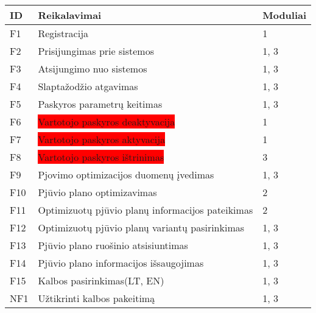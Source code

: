 \documentclass[a4paper,12pt]{article}
\begin{document}
\begin{frame}
\centering
\hspace{-2.5cm}
\label{my-label}
\begin{tabular}{|l|l|l|}
\hline
\textbf{ID}	& \textbf{Reikalavimai}						& \textbf{Moduliai}  \\ \hline

F1	& Registracija										& 1	     		\\ \hline

F2	& Prisijungimas prie sistemos						& 1, 3			\\ \hline

F3	& Atsijungimo nuo sistemos							& 1, 3			\\ \hline

F4	& Slaptažodžio atgavimas								& 1, 3			\\ \hline

F5	& Paskyros parametrų keitimas 	  					& 1, 3			\\ \hline 

F6	& \colorbox{red}{Vartotojo paskyros deaktyvacija		}			& 1				\\ \hline

F7	& \colorbox{red}{Vartotojo paskyros aktyvacija}						& 1				\\ \hline

F8	& \colorbox{red}{Vartotojo paskyros ištrinimas}					& 3				\\ \hline

F9	& Pjovimo optimizacijos duomenų įvedimas				& 1, 3			\\ \hline

F10	& Pjūvio plano optimizavimas           	   			& 2				\\ \hline

F11	& Optimizuotų pjūvio planų informacijos pateikimas	& 2     			\\ \hline

F12	& Optimizuotų pjūvio planų variantų pasirinkimas		& 1, 3			\\ \hline

F13 & Pjūvio plano ruošinio atsisiuntimas				& 1, 3			\\ \hline

F14 	& Pjūvio plano informacijos išsaugojimas				& 1, 3			\\ \hline

F15	& Kalbos pasirinkimas(LT, EN)						& 1, 3			\\ \hline

NF1 & Užtikrinti kalbos pakeitimą						& 1, 3			\\ \hline


\end{tabular}
\end{frame}
\end{document}
